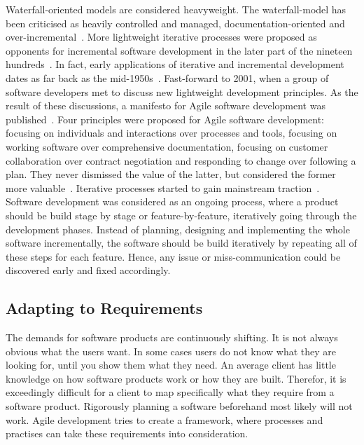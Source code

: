 \documentclass[english]{tktltiki2}
\begin{document}
Waterfall-oriented models are considered heavyweight. The waterfall-model has been criticised as heavily controlled and managed, documentation-oriented and over-incremental~\cite{Boe88, LB03}. More lightweight iterative processes were proposed as opponents for incremental software development in the later part of the nineteen hundreds~\cite{LB03}. In fact, early applications of iterative and incremental development dates as far back as the mid-1950s~\cite{LB03}. Fast-forward to 2001, when a group of software developers met to discuss new lightweight development principles. As the result of these discussions, a manifesto for Agile software development was published~\cite{BBB01a}. Four principles were proposed for Agile software development: focusing on individuals and interactions over processes and tools, focusing on working software over comprehensive documentation, focusing on customer collaboration over contract negotiation and responding to change over following a plan. They never dismissed the value of the latter, but considered the former more valuable~\cite{BBB01a}. Iterative processes started to gain mainstream traction~\cite{LB03}. Software development was considered as an ongoing process, where a product should be build stage by stage or feature-by-feature, iteratively going through the development phases. Instead of planning, designing and implementing the whole software incrementally, the software should be build iteratively by repeating all of these steps for each feature. Hence, any issue or miss-communication could be discovered early and fixed accordingly.

\subsection{Adapting to Requirements}

The demands for software products are continuously shifting. It is not always obvious what the users want. In some cases users do not know what they are looking for, until you show them what they need. An average client has little knowledge on how software products work or how they are built. Therefor, it is exceedingly difficult for a client to map specifically what they require from a software product. Rigorously planning a software beforehand most likely will not work. Agile development tries to create a framework, where processes and practises can take these requirements into consideration.
\end{document}
